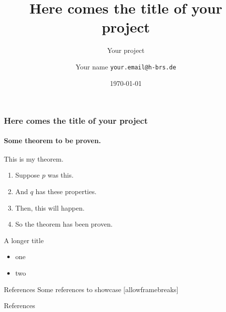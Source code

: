 \documentclass{beamer}
\title{Here comes the title of your project}
\institute{Your department}
\subtitle{Your project}
\date{\today}
\author{Your name \texttt{your.email@h-brs.de}}
\begin{document}
\begin{frame}
  \titlepage
\end{frame}


\begin{frame}
  \frametitle{Here comes the title of your project}
  \framesubtitle{Some theorem to be proven.}
  \begin{theorem}
    This is my theorem. \end{theorem}
  \begin{enumerate}
    \item<1-| alert@1> Suppose $p$ was this.
    \item<2-> And $q$ has these properties.
    \item<3-> Then, this will happen.
    \item<1-> So the theorem has been proven.
  \end{enumerate}
\end{frame}

\begin{frame}{A longer title}
  \begin{itemize}
    \item one
    \item two
  \end{itemize}
\end{frame}

\begin{frame}{References}
  Some references to showcase [allowframebreaks] \cite{knuth92,ConcreteMath,Simpson,Er01,greenwade93}
\end{frame}

\begin{frame}[allowframebreaks]{References}
  
\end{frame}
\end{document}
